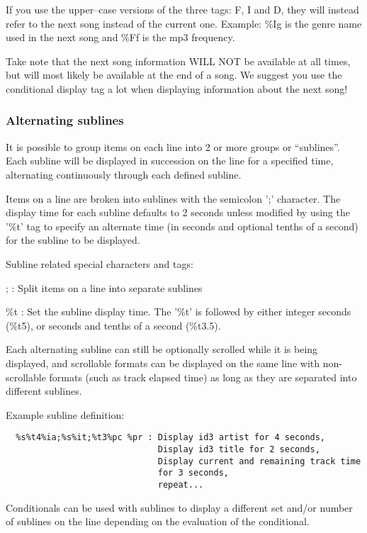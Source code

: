 If you use the upper--case versions of the
three tags: F, I and D, they will instead refer to the next song
instead of the current one. Example: \%Ig is the genre name used in the
next song and \%Ff is the mp3 frequency. 

Take note that the next song information WILL NOT be available at all
times, but will most likely be available at the end of a song. We
suggest you use the conditional display tag a lot when displaying
information about the next song! 

\subsubsection{Alternating sublines}

It is possible to group items on each line into 2 or more groups or
``sublines''. Each subline will be displayed
in succession on the line for a specified time, alternating
continuously through each defined subline. 

Items on a line are broken into sublines with the semicolon
';' character. The display time for
each subline defaults to 2 seconds unless modified by using the
'\%t' tag to specify an alternate
time (in seconds and optional tenths of a second) for the subline to be
displayed. 

Subline related special characters and tags: 

;  : Split items on a line into separate sublines

\%t  : Set the subline display time. The
'\%t' is followed by either integer
seconds (\%t5), or seconds and tenths of a second (\%t3.5).

Each alternating subline can still be optionally scrolled while it is
being displayed, and scrollable formats can be displayed on the same
line with non{}-scrollable formats (such as track elapsed time) as long
as they are separated into different sublines.

Example subline definition:

\begin{verbatim}
  %s%t4%ia;%s%it;%t3%pc %pr : Display id3 artist for 4 seconds,
                              Display id3 title for 2 seconds,
                              Display current and remaining track time
                              for 3 seconds,
                              repeat...
\end{verbatim}

Conditionals can be used with sublines to display a different set and/or number of sublines on the line depending on the evaluation of the conditional.

